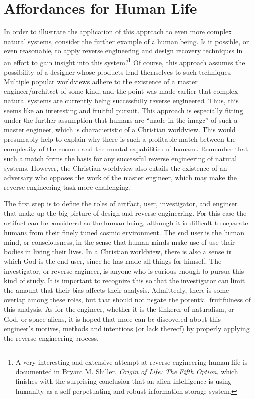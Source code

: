 \section{Affordances for Human Life}

In order to illustrate the application of this approach to even more
complex natural systems, consider the further example of a human being.
Is it possible, or even reasonable, to apply reverse engineering and
design recovery techniques in an effort to gain insight into this
system?\footnote{
A very interesting and extensive attempt at reverse
engineering human life is documented in Bryant M. Shiller,
\textit{Origin of Life: The Fifth Option},\citep{shiller2004}
which finishes with the surprising conclusion that an alien
intelligence is using humanity as a self-perpetuating and robust
information storage system.
} Of course, this approach assumes the
possibility of a designer whose products lend themselves to such
techniques. Multiple popular worldviews adhere to the existence of a
master engineer/architect of some kind, and the point was made earlier
that complex natural systems are currently being successfully reverse
engineered. Thus, this seems like an interesting and fruitful pursuit.
This approach is especially fitting under the further assumption that
humans are “made in the image” of such a master engineer, which is
characteristic of a Christian worldview. This would presumably help to
explain why there is such a profitable match between the complexity of
the cosmos and the mental capabilities of humans. Remember that such a
match forms the basis for any successful reverse engineering of natural
systems. However, the Christian worldview also entails the existence of
an adversary who opposes the work of the master engineer, which may
make the reverse engineering task more challenging.

The first step is to define the roles of artifact, user, investigator,
and engineer that make up the big picture of design and reverse
engineering. For this case the artifact can be considered as the human
being, although it is difficult to separate humans from their finely
tuned cosmic environment. The end user is the human mind, or
consciousness, in the sense that human minds make use of use their
bodies in living their lives. In a Christian worldview, there is also a
sense in which God is the end user, since he has made all things for
himself. The investigator, or reverse engineer, is anyone who is
curious enough to pursue this kind of study. It is important to
recognize this so that the investigator can limit the amount that their
bias affects their analysis. Admittedly, there is some overlap among
these roles, but that should not negate the potential fruitfulness of
this analysis. As for the engineer, whether it is the tinkerer of
naturalism, or God, or space aliens, it is hoped that more can be
discovered about this engineer’s motives, methods and intentions (or
lack thereof) by properly applying the reverse engineering process. 

